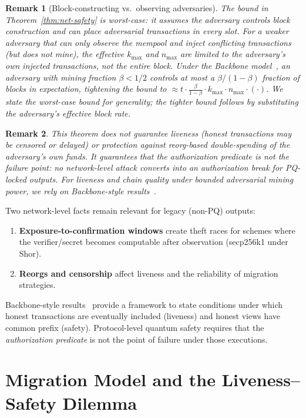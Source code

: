 \documentclass[11pt]{article}
\newtheorem{remark}{Remark}
\begin{document}
\begin{remark}[Block-constructing vs.\ observing adversaries]
The bound in Theorem~\ref{thm:net-safety} is worst-case: it assumes the adversary controls block construction and can place adversarial transactions in every slot.
For a weaker adversary that can only observe the mempool and inject conflicting transactions (but does not mine), the effective $k_{\max}$ and $n_{\max}$ are limited to the adversary's own injected transactions, not the entire block.
Under the Backbone model~\cite{garay2015bitcoin}, an adversary with mining fraction $\beta<1/2$ controls at most a $\beta/(1-\beta)$ fraction of blocks in expectation, tightening the bound to $\approx t\cdot\frac{\beta}{1-\beta}\cdot k_{\max}\cdot n_{\max}\cdot(\cdot)$.
We state the worst-case bound for generality; the tighter bound follows by substituting the adversary's effective block rate.
\end{remark}

\begin{remark}
This theorem does \emph{not} guarantee liveness (honest transactions may be censored or delayed) or protection against reorg-based double-spending of the adversary's own funds.
It guarantees that the authorization predicate is not the failure point: no network-level attack converts into an authorization break for PQ-locked outputs.
For liveness and chain quality under bounded adversarial mining power, we rely on Backbone-style results~\cite{garay2015bitcoin,pass2017analysis}.
\end{remark}

Two network-level facts remain relevant for legacy (non-PQ) outputs:
\begin{enumerate}[leftmargin=2em]
  \item \textbf{Exposure-to-confirmation windows} create theft races for schemes where the verifier/secret becomes computable after observation (secp256k1 under Shor).
  \item \textbf{Reorgs and censorship} affect liveness and the reliability of migration strategies.
\end{enumerate}
Backbone-style results~\cite{garay2015bitcoin} provide a framework to state conditions under which honest transactions are eventually included (liveness) and honest views have common prefix (safety).
Protocol-level quantum safety requires that the \emph{authorization predicate} is not the point of failure under those executions.

\section{Migration Model and the Liveness--Safety Dilemma}\label{sec:migration}
\end{document}
